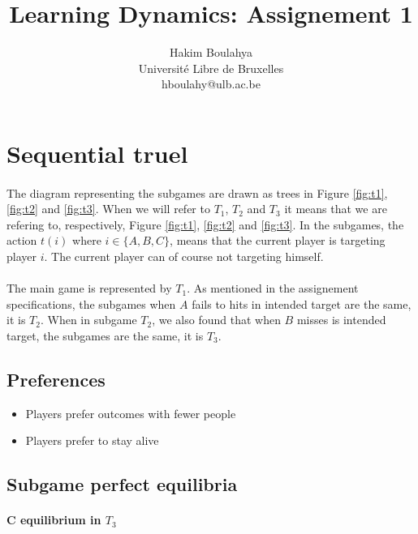 \documentclass[letterpaper]{article}
\title{Learning Dynamics: Assignement 1}
\author{Hakim Boulahya \\
Université Libre de Bruxelles\\
hboulahy@ulb.ac.be}
\begin{document}
\maketitle


\section{Sequential truel}

\paragraph{}

The diagram representing the subgames are drawn as trees in
Figure \ref{fig:t1}, \ref{fig:t2} and \ref{fig:t3}. When we will refer to $T_1$,
$T_2$ and $T_3$ it means that we are refering to, respectively,
Figure \ref{fig:t1}, \ref{fig:t2} and \ref{fig:t3}. In the subgames,
the action $t(i)$ where $i \in \{A, B, C\}$, means that the current player
is targeting player $i$. The current player can of course not targeting himself.

\paragraph{}

The main game is represented by
$T_1$. As mentioned in the
assignement specifications, the subgames when $A$ fails to hits in intended
target are the same,  it is $T_2$. When in subgame $T_2$, we also found
that when $B$ misses is intended target, the subgames are the same, it is $T_3$.

\subsection{Preferences}
\begin{itemize}
    \item Players prefer outcomes with fewer people
    \item Players prefer to stay alive
\end{itemize}


\subsection{Subgame perfect equilibria}

\paragraph{C equilibrium in $T_3$}
\end{document}
